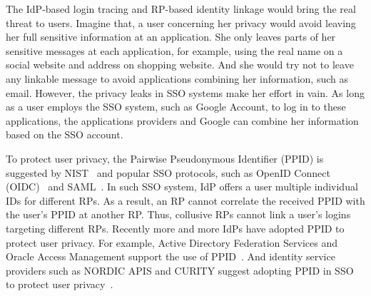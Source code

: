 The IdP-based login tracing and RP-based identity linkage would bring the real threat to users. Imagine that, a user concerning her privacy would avoid leaving her full sensitive information at an application. She only leaves parts of her sensitive messages at each application, for example, using the real name on a social website and address on shopping website. And she would try not to leave any linkable message to avoid applications combining her information, such as email.
However, the privacy leaks in SSO systems make her effort in vain. As long as a user employs the SSO system, such as Google Account, to log in to these applications, the applications providers and Google can combine her information based on the SSO account.


To protect user privacy, the Pairwise Pseudonymous Identifier (PPID) is suggested by NIST~\cite{NIST2017draft} and popular SSO protocols, such as OpenID Connect (OIDC)~\cite{OpenIDConnect} and SAML~\cite{SAMLIdentifier}. 
In such SSO system, IdP offers a user multiple individual IDs for different RPs. 
As a result, an RP cannot  correlate the received  PPID  with the user's PPID at another RP. Thus, collusive RPs cannot link a user's logins targeting different RPs. 
Recently more and more IdPs have adopted PPID to protect user privacy. For example, Active Directory Federation Services and Oracle Access Management support the use of PPID~\cite{MS, Oracle}. And identity service providers such as NORDIC APIS and CURITY suggest adopting PPID in SSO to protect user privacy~\cite{Nordic, Curity}.

